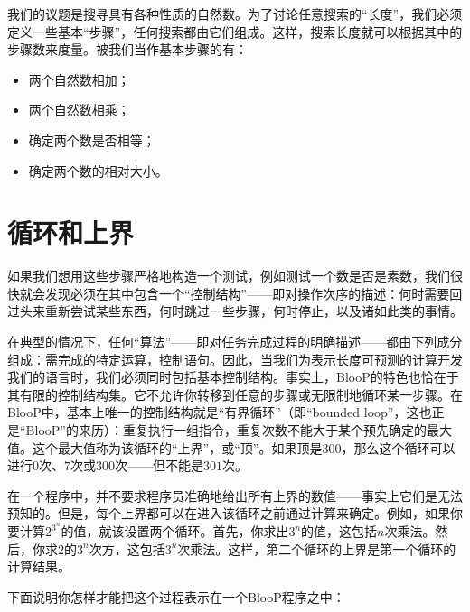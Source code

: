 我们的议题是搜寻具有各种性质的自然数。为了讨论任意搜索的“长度”，我们必须定义一些基本“步骤”，任何搜索都由它们组成。这样，搜索长度就可以根据其中的步骤数来度量。被我们当作基本步骤的有：
\begin{itemize}
\item 两个自然数相加；
\item 两个自然数相乘；
\item 确定两个数是否相等；
\item 确定两个数的相对大小。
\end{itemize}

\section{循环和上界}

如果我们想用这些步骤严格地构造一个测试，例如测试一个数是否是素数，我们很快就会发现必须在其中包含一个“控制结构”——即对操作次序的描述：何时需要回过头来重新尝试某些东西，何时跳过一些步骤，何时停止，以及诸如此类的事情。

在典型的情况下，任何“算法”——即对任务完成过程的明确描述——都由下列成分组成：需完成的特定运算，控制语句。因此，当我们为表示长度可预测的计算开发我们的语言时，我们必须同时包括基本控制结构。事实上，BlooP的特色也恰在于其有限的控制结构集。它不允许你转移到任意的步骤或无限制地循环某一步骤。在BlooP中，基本上唯一的控制结构就是“有界循环”（即“bounded loop”，这也正是“BlooP”的来历）：重复执行一组指令，重复次数不能大于某个预先确定的最大值。这个最大值称为该循环的“上界”，或“顶”。如果顶是$300$，那么这个循环可以进行$0$次、$7$次或$300$次——但不能是$301$次。

在一个程序中，并不要求程序员准确地给出所有上界的数值——事实上它们是无法预知的。但是，每个上界都可以在进入该循环之前通过计算来确定。例如，如果你要计算$2^{3^n}$的值，就该设置两个循环。首先，你求出$3^n$的值，这包括$n$次乘法。然后，你求$2$的$3^n$次方，这包括$3^n$次乘法。这样，第二个循环的上界是第一个循环的计算结果。

下面说明你怎样才能把这个过程表示在一个BlooP程序之中：

\newcommand*\CM{\>\small}
\newcommand*\PROCEDURE[2]{\inst{DEFINE PROCEDURE ``#1''} $[#2]$:}
\newcommand*\BEGINBLOCK[1]{\inst{BLOCK} $#1$: \inst{BEGIN}}
\newcommand*\ENDBLOCK[1]{\inst{BLOCK} $#1$: \inst{END}}
\newcommand*\LOOP[1]{\inst{LOOP} $#1$ \inst{TIMES}:}
\newcommand*\LOOPATMOST[1]
  {\inst{LOOP} \inst{AT} \inst{MOST} $#1$ \inst{TIMES}:}
\newcommand*\ABORTLOOP[1]{\inst{ABORT} \inst{LOOP} $#1$;}
\newcommand*\IFTHEN[1]{\inst{IF} $#1$, \inst{THEN}:}
\newcommand*\QUITBLOCK[1]{\inst{QUIT} \inst{BLOCK} $#1$;}

